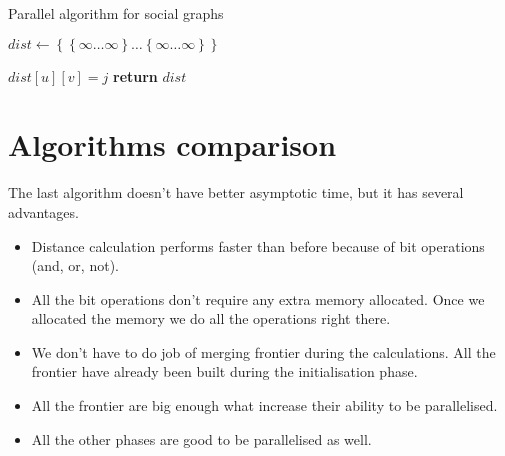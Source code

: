 \FloatBarrier
\begin{algorithm}
\caption{Parallel algorithm for social graphs}\label{all_pairs_social}
\begin{algorithmic}[1]

\State $dist\gets \left\{ {   \left\{ {\infty \ldots \infty}\right\}  \ldots \left\{ {\infty \ldots \infty}\right\} }\right\}$

\State
\algrenewcommand{}
\algrenewcommand{}
		\algrenewcommand{}	
				\State $dist[u][v] = j$		
			\EndIf	
		\EndFor
		\algrenewcommand{}
	\EndFor
\EndFor 
\State \textbf{return} $dist$ 
\EndProcedure

\end{algorithmic}
\end{algorithm}


\FloatBarrier
\section{Algorithms comparison}

The last algorithm doesn't have better asymptotic time, but it has several advantages.

\begin{itemize}
  \item Distance calculation performs faster than before because of bit operations (and, or, not).
  \item All the bit operations don't require any extra memory allocated. Once we allocated the memory we do all the operations right there.
  \item We don't have to do job of merging frontier during the calculations. All the frontier have already been built during the initialisation phase. 
  \item All the frontier are big enough what increase their ability to be parallelised.
  \item All the other phases are good to be parallelised as well.
\end{itemize}

